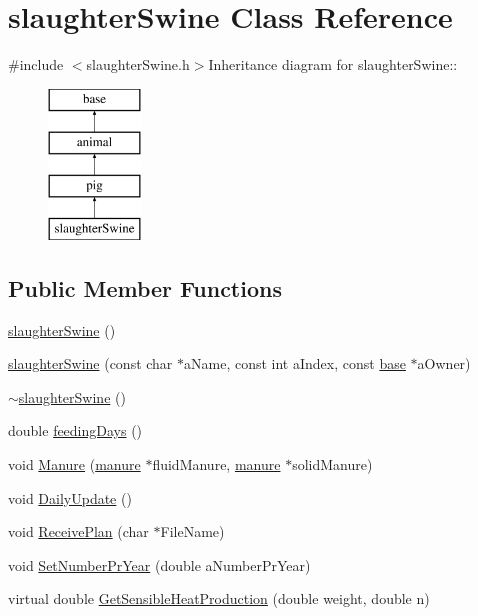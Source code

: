 \hypertarget{classslaughter_swine}{
\section{slaughterSwine Class Reference}
\label{classslaughter_swine}
}


{\ttfamily \#include $<$slaughterSwine.h$>$}Inheritance diagram for slaughterSwine::\begin{figure}[H]
\begin{center}
\leavevmode
\includegraphics[height=4cm]{classslaughter_swine}
\end{center}
\end{figure}
\subsection*{Public Member Functions}
\begin{DoxyCompactItemize}
\item 
\hyperlink{classslaughter_swine_a42dc4564b6b195e818c4a66a48569a8d}{slaughterSwine} ()
\item 
\hyperlink{classslaughter_swine_afc9e93fc1040fe9f08e50a3d7d961f46}{slaughterSwine} (const char $\ast$aName, const int aIndex, const \hyperlink{classbase}{base} $\ast$aOwner)
\item 
\hyperlink{classslaughter_swine_a200b98ef310cc3805dba1e4c79e2ccac}{$\sim$slaughterSwine} ()
\item 
double \hyperlink{classslaughter_swine_ada8ac1126ab09ff0e2077598b57aedb7}{feedingDays} ()
\item 
void \hyperlink{classslaughter_swine_a53cd5ea2a24d0991907f2bf9707acfe4}{Manure} (\hyperlink{classmanure}{manure} $\ast$fluidManure, \hyperlink{classmanure}{manure} $\ast$solidManure)
\item 
void \hyperlink{classslaughter_swine_a878b44d9124ee9a550f86ecf353e1401}{DailyUpdate} ()
\item 
void \hyperlink{classslaughter_swine_aeaaac01b283e4bc09d60b4f4bd65c442}{ReceivePlan} (char $\ast$FileName)
\item 
void \hyperlink{classslaughter_swine_a5d9ea11f9aaf40490cdd27baceb91e91}{SetNumberPrYear} (double aNumberPrYear)
\item 
virtual double \hyperlink{classslaughter_swine_a46e7d9f7b8959aaf973d82cced115232}{GetSensibleHeatProduction} (double weight, double n)
\end{DoxyCompactItemize}


